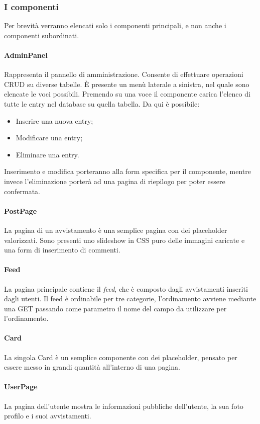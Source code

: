 \documentclass[12pt, a4paper]{article}
\begin{document}
\subsubsection{I componenti}
Per brevità verranno elencati solo i componenti principali, e non anche i componenti subordinati.
\paragraph{AdminPanel} Rappresenta il pannello di amministrazione. Consente di effettuare operazioni CRUD su diverse tabelle. È presente un menù laterale a sinistra, nel quale sono elencate le voci possibili. Premendo su una voce il componente carica l'elenco di tutte le entry nel database su quella tabella. Da qui è possibile:
\begin{itemize}
\item Inserire una nuova entry;
\item Modificare una entry;
\item Eliminare una entry.
\end{itemize}
Inserimento e modifica porteranno alla form specifica per il componente, mentre invece l'eliminazione porterà ad una pagina di riepilogo per poter essere confermata.
\paragraph{PostPage}
La pagina di un avvistamento è una semplice pagina con dei placeholder valorizzati. Sono presenti uno slideshow in CSS puro delle immagini caricate e una form di inserimento di commenti.
\paragraph{Feed}
La pagina principale contiene il \textit{feed}, che è composto dagli avvistamenti inseriti dagli utenti. Il feed è ordinabile per tre categorie, l'ordinamento avviene mediante una GET passando come parametro il nome del campo da utilizzare per l'ordinamento.
\paragraph{Card}
La singola Card è un semplice componente con dei placeholder, pensato per essere messo in grandi quantità all'interno di una pagina.
\paragraph{UserPage}
La pagina dell'utente mostra le informazioni pubbliche dell'utente, la sua foto profilo e i suoi avvistamenti.
\end{document}

